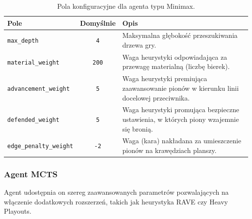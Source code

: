 \documentclass{article}
\begin{document}
\begin{table}[H]
    \centering
    \caption{Pola konfiguracyjne dla agenta typu Minimax.}
    \label{tab:config-minimax}
    \renewcommand{\arraystretch}{1.2}
    \begin{tabularx}{\textwidth}{|l|c|X|}
        \hline
        \textbf{Pole} & \textbf{Domyślnie} & \textbf{Opis} \\
        \hline
        \texttt{max\_depth} & \texttt{4} & Maksymalna głębokość przeszukiwania drzewa gry. \\
        \texttt{material\_weight} & \texttt{200} & Waga heurystyki odpowiadająca za przewagę materialną (liczbę bierek). \\
        \texttt{advancement\_weight} & \texttt{5} & Waga heurystyki premiująca zaawansowanie pionów w kierunku linii docelowej przeciwnika. \\
        \texttt{defended\_weight} & \texttt{5} & Waga heurystyki promująca bezpieczne ustawienia, w których piony wzajemnie się bronią. \\
        \texttt{edge\_penalty\_weight} & \texttt{-2} & Waga (kara) nakładana za umieszczenie pionów na krawędziach planszy. \\
        \hline
    \end{tabularx}
\end{table}

\subsubsection{Agent MCTS}

Agent udostępnia on szereg zaawansowanych parametrów pozwalających na włączenie dodatkowych rozszerzeń, takich jak heurystyka RAVE czy Heavy Playouts.
\end{document}

